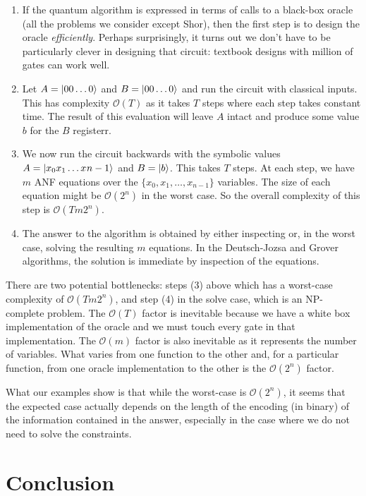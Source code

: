 \documentclass[sigplan,review]{acmart}
\theoremstyle{definition}
\begin{document}
\begin{enumerate}
\item If the quantum algorithm is expressed in terms of calls to a
  black-box oracle (all the problems we consider except Shor), then
  the first step is to design the oracle \emph{efficiently}. Perhaps
  surprisingly, it turns out we don’t have to be particularly clever
  in designing that circuit: textbook designs with million of gates
  can work well. 
  \item Let $A = \ket{00\ldots 0}$ and $B = \ket{00\ldots 0}$ and run the
circuit with classical inputs. This has complexity $\mathcal{O}(T)$ as
it takes $T$ steps where each step takes constant time. The result of
this evaluation will leave $A$ intact and produce some value $b$ for
the $B$ registerr.
\item We now run the circuit backwards with the symbolic
values $A = \ket{x_0 x_1 \ldots x_{}n-1}$ and $B = \ket{b}$. This
takes $T$ steps. At each step, we have $m$ ANF equations over the
$\{x_0,x_1,\ldots,x_{n-1}\}$ variables. The size of each equation
  might be $\mathcal{O}(2^n)$ in the worst case. So the overall
  complexity of this step is $\mathcal{O}(Tm 2^n)$.
\item The answer to the algorithm is obtained by 
  either inspecting or, in the worst case, solving
  the resulting $m$ equations. In the Deutsch-Jozsa and Grover
  algorithms, the solution is immediate by inspection of the
  equations.
\end{enumerate}
There are two potential bottlenecks: steps (3) above which has a
worst-case complexity of $\mathcal{O}(Tm 2^n)$, and step (4)
in the solve case, which is an NP-complete problem. The $\mathcal{O}(T)$
factor is inevitable because we have a white box implementation of the
oracle and we must touch every gate in that implementation. The
$\mathcal{O}(m)$ factor is also inevitable as it represents the number
of variables. What varies from one function to the other and, for a
particular function, from one oracle implementation to the other is
the $\mathcal{O}(2^n)$ factor.

What our examples show is that while the worst-case is $\mathcal{O}(2^n)$,
it seems that the expected case actually depends on the length of the
encoding (in binary) of the information contained in the answer, especially
in the case where we do not need to solve the constraints.

\section{Conclusion}
\label{sec6}
\end{document}

